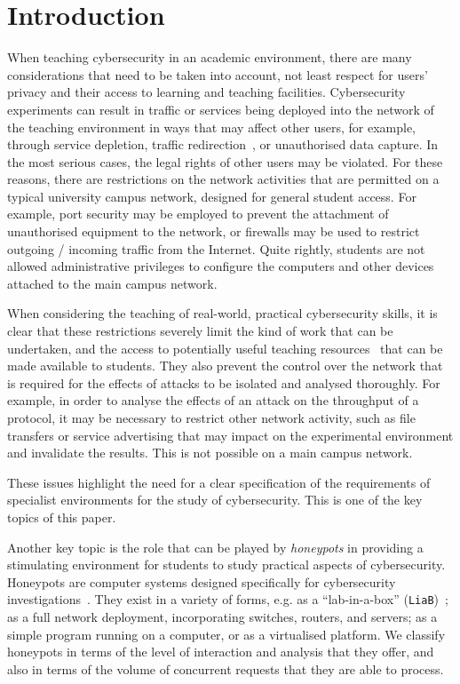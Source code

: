 \documentclass{ieeeaccess}
\begin{document}
\section{Introduction}\label{intro}
When teaching cybersecurity in an academic environment, there are many
considerations that need to be taken into account, not least respect for
users' privacy and their access to learning and teaching facilities.
Cybersecurity experiments can result in traffic or services being deployed
into the network of the teaching environment in ways that may affect other
users, for example, through service depletion, traffic
redirection~\cite{ACGO:06,LR:06}, or unauthorised data capture. In the most
serious cases, the legal rights of other users may be violated.
For these reasons, there are restrictions on the network activities that are
permitted on a typical university campus network, designed for general
student access. For example, port security may be employed to prevent the
attachment of unauthorised equipment to the network, or firewalls may be used
to restrict outgoing / incoming traffic from the Internet. Quite rightly,
students are not allowed administrative privileges to configure the computers
and other devices attached to the main campus network.

When considering the teaching of real-world, practical cybersecurity skills, it
is clear that these restrictions severely limit the kind of work that can be
undertaken, and the access to potentially useful teaching
resources~\cite{ACGO:06,YYLCHJ:04} that can be made available to students. They
also prevent the control over the network that is required for the effects of
attacks to be isolated and analysed thoroughly. For example, in order to
analyse the effects of an attack on the throughput of a protocol, it may be
necessary to restrict other network activity, such as file transfers or service
advertising that may impact on the experimental environment and invalidate
the results. This is not possible on a main campus network.

These issues highlight the need for a clear specification of the requirements
of specialist environments for the study of cybersecurity. This is one of the
key topics of this paper.

Another key topic is the role that can be played by \emph{honeypots} in
providing a stimulating environment for students to study practical aspects of
cybersecurity.  Honeypots are computer systems designed specifically for
cybersecurity investigations~\cite{FKAS:17,BCF:12}.  They exist in a variety of
forms, e.g. as a ``lab-in-a-box'' (\texttt{LiaB})~\cite{CFDMH:09}; as a full
network deployment, incorporating switches, routers, and servers; as a simple
program running on a computer, or as a virtualised platform. 
We classify honeypots in terms of the level of interaction and analysis that
they offer, and also in terms of the volume of concurrent requests that they
are able to process.
\end{document}
